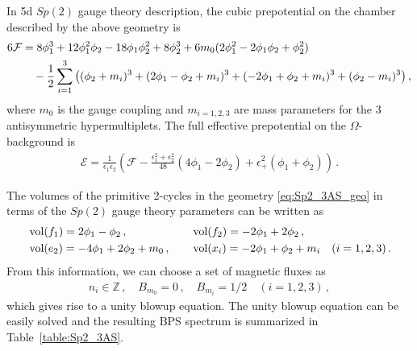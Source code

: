 In 5d $Sp(2)$ gauge theory description, the cubic prepotential on the chamber described by the above geometry
 is
\begin{align}
6\mathcal{F}
&= 8\phi_1^3 + 12\phi_1^2 \phi_2 - 18\phi_1 \phi_2^2 + 8\phi_2^3 + 6m_0 (2\phi_1^2 - 2\phi_1 \phi_2 + \phi_2^2) \\
& \quad - \frac{1}{2} \sum_{i=1}^3 \qty((\phi_2 + m_i)^3 + (2\phi_1 - \phi_2 + m_i)^3 + (-2\phi_1 + \phi_2 + m_i)^3 + (\phi_2 - m_i)^3) \, , \nonumber
\end{align}
where $ m_0 $ is the gauge coupling and $ m_{i=1, 2, 3} $ are mass parameters for the 3 antisymmetric hypermultiplets. The full effective prepotential on the $\Omega$-background is
\begin{align}
\mathcal{E}
= \frac{1}{\epsilon_1 \epsilon_2} \left(\mathcal{F} - \frac{\epsilon_1^2 + \epsilon_2^2}{48} (4\phi_1 - 2\phi_2) + \epsilon_+^2 (\phi_1 + \phi_2) \right) \, .
\end{align}

The volumes of the primitive 2-cycles in the geometry \eqref{eq:Sp2_3AS_geo} in terms of the $Sp(2)$ gauge theory parameters can be written as
\begin{align}
&\operatorname{vol} (f_1) = 2\phi_1 - \phi_2 \, , \quad
&&\operatorname{vol} (f_2) = -2\phi_1 + 2\phi_2 \, , \nonumber \\
&\operatorname{vol} (e_2) = -4\phi_1 + 2\phi_2 + m_0 \, , \quad
&&\operatorname{vol} (x_i) = -2\phi_1 + \phi_2 + m_i \quad (i = 1, 2, 3) \, .
\end{align}
From this information, we can choose a set of magnetic fluxes as
\begin{align}
n_i \in \mathbb{Z} \, , \quad
B_{m_0} = 0 \, , \quad
B_{m_i} = 1/2 \quad (i = 1, 2, 3) \, ,
\end{align}
which gives rise to a unity blowup equation. The unity blowup equation can be easily solved and the resulting BPS spectrum is summarized in Table~\ref{table:Sp2_3AS}.

